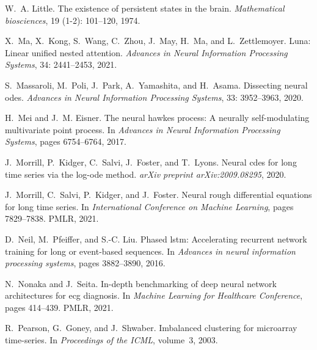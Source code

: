 \documentclass{MITcsail}
\begin{document}
\begin{thebibliography}{96}
W.~A. Little.
\newblock The existence of persistent states in the brain.
\newblock \emph{Mathematical biosciences}, 19 (1-2):
  101--120, 1974.

X.~Ma, X.~Kong, S.~Wang, C.~Zhou, J.~May, H.~Ma, and L.~Zettlemoyer.
\newblock Luna: Linear unified nested attention.
\newblock \emph{Advances in Neural Information Processing Systems},
  34: 2441--2453, 2021.

S.~Massaroli, M.~Poli, J.~Park, A.~Yamashita, and H.~Asama.
\newblock Dissecting neural odes.
\newblock \emph{Advances in Neural Information Processing Systems},
  33: 3952--3963, 2020.

H.~Mei and J.~M. Eisner.
\newblock The neural hawkes process: A neurally self-modulating multivariate
  point process.
\newblock In \emph{Advances in Neural Information Processing Systems}, pages
  6754--6764, 2017.

J.~Morrill, P.~Kidger, C.~Salvi, J.~Foster, and T.~Lyons.
\newblock Neural cdes for long time series via the log-ode method.
\newblock \emph{arXiv preprint arXiv:2009.08295}, 2020.

J.~Morrill, C.~Salvi, P.~Kidger, and J.~Foster.
\newblock Neural rough differential equations for long time series.
\newblock In \emph{International Conference on Machine Learning}, pages
  7829--7838. PMLR, 2021.

D.~Neil, M.~Pfeiffer, and S.-C. Liu.
\newblock Phased lstm: Accelerating recurrent network training for long or
  event-based sequences.
\newblock In \emph{Advances in neural information processing systems}, pages
  3882--3890, 2016.

N.~Nonaka and J.~Seita.
\newblock In-depth benchmarking of deep neural network architectures for ecg
  diagnosis.
\newblock In \emph{Machine Learning for Healthcare Conference}, pages 414--439.
  PMLR, 2021.

R.~Pearson, G.~Goney, and J.~Shwaber.
\newblock Imbalanced clustering for microarray time-series.
\newblock In \emph{Proceedings of the ICML}, volume~3, 2003.


\end{thebibliography}
\end{document}
